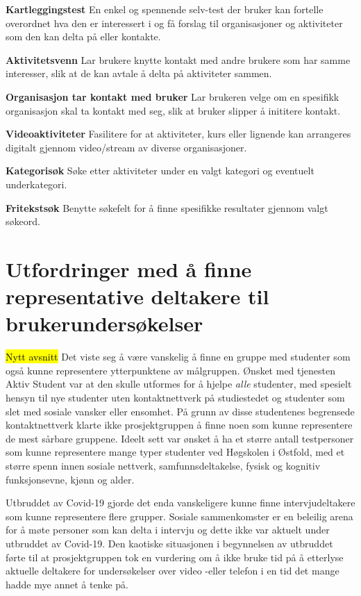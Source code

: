 \begin{compactitem}
\item[{\bf Kartleggingstest}] En enkel og spennende selv-test der bruker kan fortelle overordnet hva den er interessert i og få forslag til organisasjoner og aktiviteter som den kan delta på eller kontakte.
\item[{\bf Aktivitetsvenn}] Lar brukere knytte kontakt med andre brukere som har samme interesser, slik at de kan avtale å delta på aktiviteter sammen.
\item[{\bf Organisasjon tar kontakt med bruker}] Lar brukeren velge om en spesifikk organisasjon skal ta kontakt med seg, slik at bruker slipper å inititere kontakt.
\item[{\bf Videoaktiviteter}] Fasilitere for at aktiviteter, kurs eller lignende kan arrangeres digitalt gjennom video/stream av diverse organisasjoner.
\item[{\bf Kategorisøk}] Søke etter aktiviteter under en valgt kategori og eventuelt underkategori.
\item[{\bf Fritekstsøk}] Benytte søkefelt for å finne spesifikke resultater gjennom valgt søkeord.
\end{compactitem}

\section{Utfordringer med å finne representative deltakere til brukerundersøkelser}
\hl{Nytt avsnitt}
Det viste seg å være vanskelig å finne en gruppe med studenter som også kunne representere ytterpunktene av målgruppen. Ønsket med tjenesten Aktiv Student var at den skulle utformes for å hjelpe {\em alle} studenter, med spesielt hensyn til nye studenter uten kontaktnettverk på studiestedet og studenter som slet med sosiale vansker eller ensomhet. På grunn av disse studentenes begrensede kontaktnettverk klarte ikke prosjektgruppen å finne noen som kunne representere de mest sårbare gruppene. Ideelt sett var ønsket å ha et større antall testpersoner som kunne representere mange typer studenter ved Høgskolen i Østfold, med et større spenn innen sosiale nettverk, samfunnsdeltakelse, fysisk og kognitiv funksjonsevne, kjønn og alder.

Utbruddet av Covid-19 gjorde det enda vanskeligere kunne finne intervjudeltakere som kunne representere flere grupper. Sosiale sammenkomster er en beleilig arena for å møte personer som kan delta i intervju og dette ikke var aktuelt under utbruddet av Covid-19. Den kaotiske situasjonen i begynnelsen av utbruddet førte til at prosjektgruppen tok en vurdering om å ikke bruke tid på å etterlyse aktuelle deltakere for undersøkelser over video -eller telefon i en tid det mange hadde mye annet å tenke på. 

